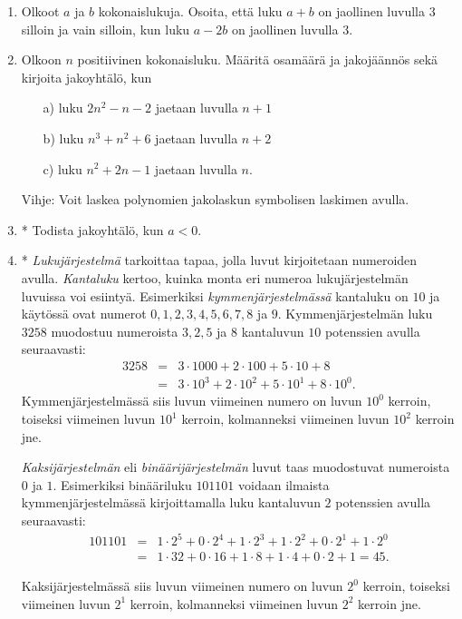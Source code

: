 \begin{enumerate}
\item Olkoot $a$ ja $b$ kokonaislukuja. Osoita, että luku $a + b$ on jaollinen luvulla $3$ silloin ja vain silloin, kun luku $a - 2b$ on jaollinen luvulla $3$.

\item Olkoon $n$ positiivinen kokonaisluku. Määritä osamäärä ja jakojäännös sekä kirjoita jakoyhtälö, kun
\begin{itemize}
\item[a)] luku $2n^2 - n - 2$ jaetaan luvulla $n + 1$
\item[b)] luku $n^3 + n^2 + 6$ jaetaan luvulla $n + 2$
\item[c)] luku $n^2 + 2n - 1$ jaetaan luvulla $n$.
\end{itemize}
Vihje: Voit laskea polynomien jakolaskun symbolisen laskimen avulla.

\item * %
Todista jakoyhtälö, kun $a<0$.

\item *
{\em Lukujärjestelmä} tarkoittaa tapaa, jolla luvut kirjoitetaan numeroiden avulla. {\em Kantaluku} kertoo, kuinka monta eri numeroa lukujärjestelmän luvuissa voi esiintyä. Esimerkiksi {\em kymmenjärjestelmässä} kantaluku on $10$ ja käytössä ovat numerot $0,1,2,3,4,5,6,7,8$ ja $9$. Kymmenjärjestelmän luku $3258$ muodostuu numeroista $3,2,5$ ja $8$ kantaluvun $10$ potenssien avulla seuraavasti:
\begin{eqnarray*}
3258 &=&3\cdot 1000+2\cdot 100+5\cdot 10+8\\
&=& 3\cdot 10^3+2\cdot 10^2+5\cdot 10^1+8\cdot 10^0.
\end{eqnarray*}
Kymmenjärjestelmässä siis luvun viimeinen numero on luvun $10^0$ kerroin, toiseksi viimeinen luvun $10^1$ kerroin, kolmanneksi viimeinen luvun $10^2$ kerroin jne.

{\em Kaksijärjestelmän} eli {\em binäärijärjestelmän} luvut taas muodostuvat numeroista $0$ ja $1$. Esimerkiksi binääriluku $101101$ voidaan ilmaista kymmenjärjestelmässä kirjoittamalla luku kantaluvun $2$ potenssien avulla seuraavasti:
\begin{eqnarray*}
101101&=&1\cdot2^5+0\cdot2^4+1\cdot2^3+1\cdot2^2+0\cdot2^1+1\cdot2^0 \\
&=& 1\cdot32+0\cdot16+1\cdot8+1\cdot4+0\cdot2+1=45.
\end{eqnarray*}

Kaksijärjestelmässä siis luvun viimeinen numero on luvun $2^0$ kerroin, toiseksi viimeinen luvun $2^1$ kerroin, kolmanneksi viimeinen luvun $2^2$ kerroin jne.


\end{enumerate}
